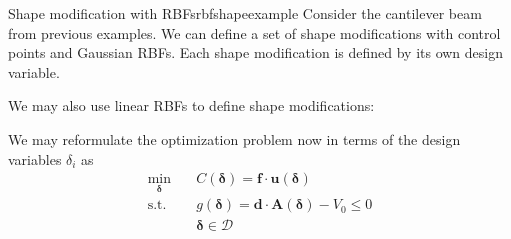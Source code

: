 \begin{example}{Shape modification with RBFs}{rbfshapeexample}   
    Consider the cantilever beam from previous examples. We can define a set of shape modifications with control points and Gaussian RBFs. Each shape modification is defined by its own design variable. 
    
    \begin{minipage}{.5\textwidth}
        \centering
        
    \end{minipage}%
    \begin{minipage}{.5\textwidth}
        \centering
        
    \end{minipage}
    \begin{minipage}{.5\textwidth}
        \centering
        
    \end{minipage}%
    \begin{minipage}{.5\textwidth}
        \centering
        
    \end{minipage}
    We may also use linear RBFs to define shape modifications:
    
    \begin{minipage}{.5\textwidth}
        \centering
        
    \end{minipage}%
    \begin{minipage}{.5\textwidth}
        \centering
        
    \end{minipage}
    \begin{minipage}{.5\textwidth}
        \centering
        
    \end{minipage}%
    \begin{minipage}{.5\textwidth}
        \centering
        
    \end{minipage}
\end{example}

We may reformulate the optimization problem now in terms of the design variables $\delta_i$ as 
\begin{equation}
    \begin{aligned}
        \min_{\pmb{\delta}} \quad & C(\pmb{\delta}) = \mathbf{f} \cdot \mathbf{u}(\pmb{\delta})\\
        \textrm{s.t.} \quad & g(\pmb{\delta}) = \mathbf{d} \cdot \mathbf{A}(\pmb{\delta}) - V_0 \le 0  \\
                            & \pmb{\delta} \in \mathcal{D}
    \end{aligned}
    \label{eq:shape_optimization_morph}
\end{equation}

